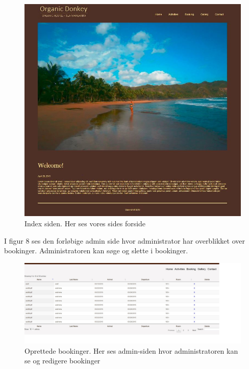 \documentclass[12pt,a4paper]{article}
\begin{document}
\begin{figure}[H]
\centering
\includegraphics[scale=0.90] {brugergransefladebilled2.jpg}
\caption{Index siden. Her ses vores sides forside} 
\end{figure} 
\newpage
I figur 8 ses den forløbige admin side hvor administrator har overblikket
over bookinger. Administratoren kan søge og slette i bookinger. 
\begin{figure}[H]
\centering
\includegraphics[scale=0.4] {brugergransefladebilled3.jpg}
\caption{Oprettede bookinger. Her ses admin-siden hvor administratoren kan se og redigere bookinger}
\end{figure}
\end{document}
